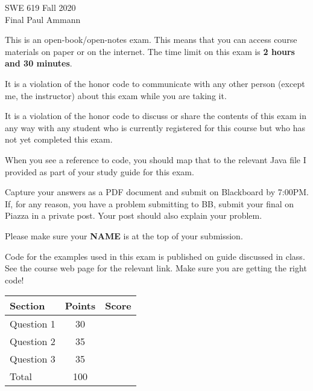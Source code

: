 \begin{center}
   SWE 619 \hfill Fall 2020 \\
   Final \hfill  Paul Ammann\\
\end{center}

This is an open-book/open-notes exam.
This means that you can access course materials on paper or on the internet.
The time limit on this exam is {\bf 2 hours and 30 minutes}.

It is a violation of the honor code to communicate with any
other person (except me, the instructor) about this exam
while you are taking it.

It is a violation of the honor code to
discuss or share the contents of this exam in any way
with any student who is currently registered for this course
but who has not yet completed this exam.

When you see a reference to code, you should
map that to the relevant Java file I provided as part of your study
guide for this exam. 

Capture your answers as a PDF document and submit on
Blackboard by 7:00PM.
If, for any reason, you have a problem submitting to BB, 
submit your final on Piazza in a private post.  Your post
should also explain your problem.

Please make sure your {\bf NAME} is at the top of your submission.

Code for the examples used in this exam is published on
guide discussed in class.  See the course web page for the relevant link.
Make sure you are getting the right code!

\vspace{0.5cm}

{\Large
\begin{center}
\begin{tabular}{|l|c|c|} \hline
Section		&	Points	&	Score \\ \hline \hline
Question 1	&	 30	& \\ \hline
Question 2	&	 35	& \\ \hline
Question 3 	&	 35	& \\ \hline
\hline
Total		&	100	& \\ \hline
\end{tabular}
\end{center}

}
